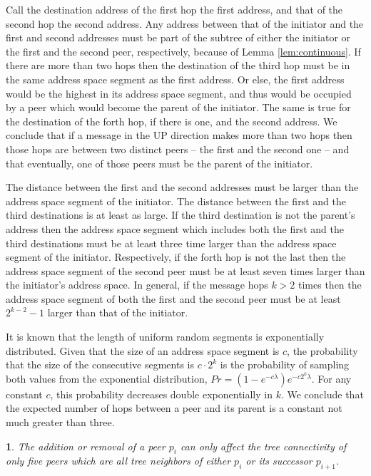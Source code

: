 \documentclass[12pt,english,journal]{elsarticle}
\makeatletter
\numberwithin{equation}{section}
\numberwithin{figure}{section}
\theoremstyle{plain}
\theoremstyle{plain}
\newtheorem{lem}[thm]{\protect\lemmaname}
\newenvironment{proof}[1][\protect\proofname]{\par
\normalfont\topsep6\p@\@plus6\p@\relax
\trivlist
\itemindent\parindent
\item[\hskip\labelsep
\scshape
#1]\ignorespaces
}{\endtrivlist\@endpefalse
}
\providecommand{\proofname}{Proof}
\providecommand{\lemmaname}{Lemma}
\makeatother
\begin{document}
\begin{proof}
Call the destination address of the first hop the first address, and
that of the second hop the second address. Any address between that
of the initiator and the first and second addresses must be part of
the subtree of either the initiator or the first and the second peer,
respectively, because of Lemma \ref{lem:continuous}. If there are
more than two hops then the destination of the third hop must be in
the same address space segment as the first address. Or else, the
first address would be the highest in its address space segment, and
thus would be occupied by a peer which would become the parent of
the initiator. The same is true for the destination of the forth hop,
if there is one, and the second address. We conclude that if a message
in the UP direction makes more than two hops then those hops are between
two distinct peers -- the first and the second one -- and that eventually,
one of those peers must be the parent of the initiator.

The distance between the first and the second addresses must be larger
than the address space segment of the initiator. The distance between
the first and the third destinations is at least as large. If the
third destination is not the parent's address then the address space
segment which includes both the first and the third destinations must
be at least three time larger than the address space segment of the
initiator. Respectively, if the forth hop is not the last then the
address space segment of the second peer must be at least seven times
larger than the initiator's address space. In general, if the message
hops $k>2$ times then the address space segment of both the first
and the second peer must be at least $2^{k-2}-1$ larger than that
of the initiator.

It is known \citep{randomsegments} that the length of uniform random
segments is exponentially distributed. Given that the size of an address
space segment is $c$, the probability that the size of the consecutive
segments is $c\cdot2^{k}$ is the probability of sampling both values
from the exponential distribution, $Pr=\left(1-e^{-c\lambda}\right)e^{-c2^{k}\lambda}$.
For any constant $c$, this probability decreases double exponentially
in $k$. We conclude that the expected number of hops between a peer
and its parent is a constant not much greater than three.\end{proof}
\begin{lem}
The addition or removal of a peer $p_{i}$ can only affect the tree
connectivity of only five peers which are all tree neighbors of either
$p_{i}$ or its successor $p_{i+1}$.\end{lem}
\end{document}
